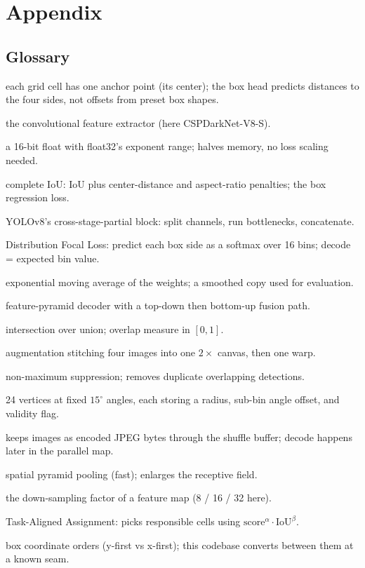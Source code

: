 \chapter{Appendix}

\section{Glossary}
\begin{description}[leftmargin=0pt,style=nextline,itemsep=2pt]
  \item[Anchor-free] each grid cell has one anchor point (its center); the box head
    predicts distances to the four sides, not offsets from preset box shapes.
  \item[Backbone] the convolutional feature extractor (here CSPDarkNet-V8-S).
  \item[bfloat16] a 16-bit float with float32's exponent range; halves memory, no loss
    scaling needed.
  \item[CIoU] complete IoU: IoU plus center-distance and aspect-ratio penalties; the box
    regression loss.
  \item[C2f] YOLOv8's cross-stage-partial block: split channels, run bottlenecks,
    concatenate.
  \item[DFL] Distribution Focal Loss: predict each box side as a softmax over 16 bins;
    decode = expected bin value.
  \item[EMA] exponential moving average of the weights; a smoothed copy used for
    evaluation.
  \item[FPN-PAN] feature-pyramid decoder with a top-down then bottom-up fusion path.
  \item[IoU] intersection over union; overlap measure in $[0,1]$.
  \item[Mosaic] augmentation stitching four images into one $2\times$ canvas, then one warp.
  \item[NMS] non-maximum suppression; removes duplicate overlapping detections.
  \item[PolyYOLO radial format] 24 vertices at fixed $15^\circ$ angles, each storing a
    radius, sub-bin angle offset, and validity flag.
  \item[SkipDecoding] keeps images as encoded JPEG bytes through the shuffle buffer;
    decode happens later in the parallel map.
  \item[SPPF] spatial pyramid pooling (fast); enlarges the receptive field.
  \item[Stride] the down-sampling factor of a feature map (8 / 16 / 32 here).
  \item[TAL] Task-Aligned Assignment: picks responsible cells using
    $\text{score}^{\alpha}\cdot\text{IoU}^{\beta}$.
  \item[yxyx / xyxy] box coordinate orders (y-first vs x-first); this codebase converts
    between them at a known seam.
\end{description}


